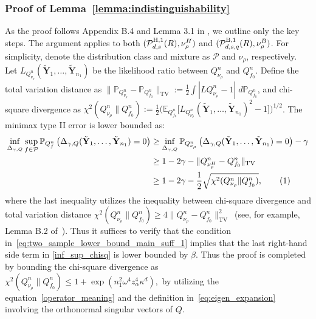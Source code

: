 \documentclass[twoside,11pt]{article}
\newcommand\numberthis{\addtocounter{equation}{1}\tag{\theequation}}
\newcommand{\distClassGeneric}{\mathcal{P}}
\newcommand{\sampleSizeOne}{\sampleSize_1}
\newcommand{\vectorize}[1]{\mathbf{#1}}
\newcommand{\dimDensity}{d} %
\newcommand{\sampleSize}{n}
\newcommand{\smoothness}{s}
\newcommand{\privacyMechanism}{Q}
\newcommand{\ballRadius}{R}
\newcommand{\privacyParameter}{\alpha} %
\newcommand{\maxErrorTypeTwo}{\beta} %
\newcommand{\maxErrorTypeOne}{\gamma} %
\newcommand{\binNum}{\kappa}           %
\newcommand{\besovParamMicroscope}{q}
\newcommand{\pBesovGof}{ %
	\distClassGeneric_{%
		\dimDensity, \smoothness, \besovParamMicroscope
	}^{%
		\mathrm{B,1}
	}
	(\ballRadius)
}
\newcommand{\pHolderGof}{ %
	\distClassGeneric_{%
		\dimDensity, \smoothness
	}^{%
		\mathrm{H,1}
	}
	(\ballRadius)
}
\begin{document}
\begin{appendix}
	\subsubsection{Proof of Lemma~\ref{lemma:indistinguishability}}\label{proof:indistinguishability}
	As the proof follows Appendix B.4 and Lemma 3.1 in \citet{Lam-Weil2021MinimaxConstraint}, we outline only the key steps. The argument applies to both \((\pHolderGof, \nu_\rho^H)\) and \((\pBesovGof, \nu_\rho^B)\). For simplicity, denote the distribution class and mixture as \(\mathcal{P}\) and \(\nu_\rho\), respectively.
	Let
	$L_{Q_{\nu_\rho}^n}(\tilde{\mathbf{Y}}_1, \dots, \tilde{\mathbf{Y}}_{n_1})$ be the likelihood ratio between  $Q_{\nu_\rho}^n$ and $Q_{f_0}^n$.
	Define the total variation distance as
	$\| \mathbb{P}_{Q_{\nu_\rho}^n} - \mathbb{P}_{Q_{f_0}^n} \|_{\text{TV}} := \frac{1}{2} \int | L Q_{\nu_\rho}^n - 1 |\; d\mathbb{P}_{Q_{f_0}^n}$,
	and chi-square divergence as
	$
	{\chi^2} 
	(
	Q^\sampleSize_{\nu_\rho}
	\|
	Q^\sampleSize_{f_0}
	)
	:=\frac{1}{2} 
	\bigl( \mathbb{E}_{Q_{f_0}^n} 
	\bigl[
	L_{Q_{\nu_\rho}^n}(\tilde{\mathbf{Y}}_1, \dots, \tilde{\mathbf{Y}}_{n_1})^2 - 1 \bigr]
	\bigr)^{1/2}$.
	The minimax type II error is lower bounded as:
	\begin{align*}
		\inf_{\Delta_{\gamma,Q}}
		\sup_{f \in \mathcal{P}}
		\mathbb{P}_{Q^n_f}
		\left( \Delta_{\gamma,Q}
		(
		\tilde{\vectorize{Y}}_1, \dots, \tilde{\vectorize{Y}}_{\sampleSize_1}
		) = 0 \right)
		&\geq
		\inf_{\Delta_{\gamma,Q}} \mathbb{P}_{Q^n_{\nu_\rho}} \left( \Delta_{\gamma,Q}(
		\tilde{\vectorize{Y}}_1, \dots, \tilde{\vectorize{Y}}_{\sampleSize_1}
		) = 0 \right) - \gamma
		\\
		&\geq 
		1-2\maxErrorTypeOne- \|Q^\sampleSize_{\nu_\rho^H}
		-
		Q^\sampleSize_{f_0}\|_{\mathrm{TV}}
		\\&\geq 
		1-2\maxErrorTypeOne- 
		\frac{1}{2}
		\sqrt{
			{\chi^2} 
			(
			Q^\sampleSize_{\nu_\rho}
			\|
			Q^\sampleSize_{f_0}
			) 
		},
		\numberthis
		\label{inf_sup_chisq}
	\end{align*}
	where the last inequality utilizes the inequality between chi-square divergence and total variation distance $ {\chi^2} 
	(
	Q^\sampleSize_{\nu_\rho}
	\|
	Q^\sampleSize_{f_0}
	) \geq 4 \|Q^\sampleSize_{\nu_\rho}
	-
	Q^\sampleSize_{f_0}\|^2_{\mathrm{TV}}$~(see, for example, Lemma B.2 of~\citet{Lam-Weil2021MinimaxConstraint}).
	Thus it suffices to verify that the condition in~\eqref{eq:two_sample_lower_bound_main_suff_1} implies that the last right-hand side term in \eqref{inf_sup_chisq} is lower bounded by $\maxErrorTypeTwo$.
	Thus the proof is completed by bounding the chi-square divergence as
	$
	{\chi^2} 
	(
	Q^\sampleSize_{\nu_\rho}
	\|
	Q^\sampleSize_{f_0}
	) \leq  
	1+
	\exp(\sampleSizeOne^2 \omega^4 z_\privacyParameter^4 \binNum^\dimDensity),
	$
	by utilizing the equation~\eqref{operator_meaning} and  the definition in~\eqref{eq:eigen_expansion} involving the orthonormal singular vectors of $\privacyMechanism$.
	

\end{appendix}
\end{document}
